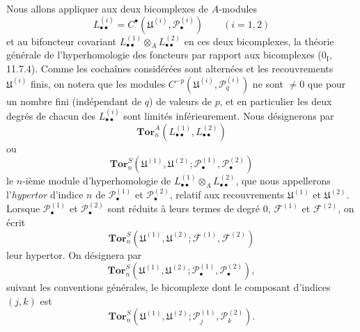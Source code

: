 \begin{env}[6.6.2]
Nous allons appliquer aux deux bicomplexes de $A$-modules
\[
  L_{\bullet\bullet}^{(i)}
  =C^\bullet(\mathfrak U^{(i)},\mathscr P_\bullet^{(i)})
  \qquad(i=1,2)
\]
et au bifoncteur covariant
$L_{\bullet\bullet}^{(1)}\otimes_A L_{\bullet\bullet}^{(2)}$ en ces deux
bicomplexes, la théorie générale de l'hyperhomologie des foncteurs par rapport
aux bicomplexes ($0_{\mathrm I}$, 11.7.4). Comme les cochaînes considérées sont
alternées et les recouvrements $\mathfrak U^{(i)}$ finis, on notera que les
modules $C^{-p}(\mathfrak U^{(i)},\mathscr P_q^{(i)})$ ne sont $\ne0$ que pour
un nombre fini (indépendant de $q$) de valeurs de $p$, et en particulier les
deux degrés de chacun des $L_{\bullet\bullet}^{(i)}$ sont limités
inférieurement. Nous désignerons par
\[
  \mathbf{Tor}_n^A(L_{\bullet\bullet}^{(1)},L_{\bullet\bullet}^{(2)})
\]
ou
\[
  \mathbf{Tor}_n^S
  (\mathfrak U^{(1)},\mathfrak U^{(2)};
   \mathscr P_\bullet^{(1)},\mathscr P_\bullet^{(2)})
\]
le $n$-ième module d'hyperhomologie de
$L_{\bullet\bullet}^{(1)}\otimes_A L_{\bullet\bullet}^{(2)}$, que nous
appellerons l'\emph{hypertor} d'indice $n$ de
$\mathscr P_\bullet^{(1)}$ et $\mathscr P_\bullet^{(2)}$, relatif aux
recouvrements $\mathfrak U^{(1)}$ et $\mathfrak U^{(2)}$. Lorsque
$\mathscr P_\bullet^{(1)}$ et $\mathscr P_\bullet^{(2)}$ sont réduits à leurs
termes de degré 0, $\mathscr F^{(1)}$ et $\mathscr F^{(2)}$, on écrit
\[
  \mathbf{Tor}_n^S
  (\mathfrak U^{(1)},\mathfrak U^{(2)};
   \mathscr F^{(1)},\mathscr F^{(2)})
\]
leur hypertor. On désignera par
\[
  \mathbf{Tor}_n^S
  (\mathfrak U^{(1)},\mathfrak U^{(2)};
   \mathscr P_\bullet^{(1)},\mathscr P_\bullet^{(2)}),
\]
suivant les conventions générales, le bicomplexe dont le composant d'indices
$(j,k)$ est
\[
  \mathbf{Tor}_n^S
  (\mathfrak U^{(1)},\mathfrak U^{(2)};
   \mathscr P_j^{(1)},\mathscr P_k^{(2)}).
\]


\end{env}

